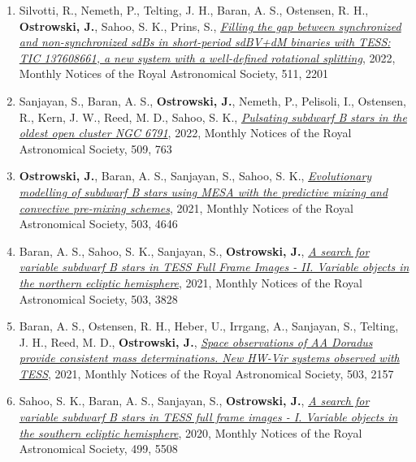 \documentclass[margin, 10pt]{res} %
\begin{document}
\begin{resume}
\begin{enumerate}
    \item Silvotti, R., Nemeth, P., Telting, J. H., Baran, A. S., Ostensen, R. H., \textbf{Ostrowski, J.}, Sahoo, S. K., Prins, S., \href{https://ui.adsabs.harvard.edu/abs/2022MNRAS.511.2201S/abstract}{\textit{Filling the gap between synchronized and non-synchronized sdBs in short-period sdBV+dM binaries with TESS: TIC 137608661, a new system with a well-defined rotational splitting}}, 2022, Monthly Notices of the Royal Astronomical Society, 511, 2201

    \item Sanjayan, S., Baran, A. S., \textbf{Ostrowski, J.}, Nemeth, P., Pelisoli, I., Ostensen, R., Kern, J. W., Reed, M. D., Sahoo, S. K., \href{https://ui.adsabs.harvard.edu/abs/2022MNRAS.509..763S/abstract}{\textit{Pulsating subdwarf B stars in the oldest open cluster NGC 6791}}, 2022, Monthly Notices of the Royal Astronomical Society, 509, 763

    \item \textbf{Ostrowski, J.}, Baran, A. S., Sanjayan, S., Sahoo, S. K., \href{https://ui.adsabs.harvard.edu/abs/2021MNRAS.503.4646O/abstract}{\textit{Evolutionary modelling of subdwarf B stars using MESA with the predictive mixing and convective pre-mixing schemes}}, 2021, Monthly Notices of the Royal Astronomical Society, 503, 4646

    \item Baran, A. S., Sahoo, S. K., Sanjayan, S., \textbf{Ostrowski, J.}, \href{https://ui.adsabs.harvard.edu/abs/2021MNRAS.503.3828B/abstract}{\textit{A search for variable subdwarf B stars in TESS Full Frame Images - II. Variable objects in the northern ecliptic hemisphere}}, 2021, Monthly Notices of the Royal Astronomical Society, 503, 3828

    \item Baran, A. S., Ostensen, R. H., Heber, U., Irrgang, A., Sanjayan, S., Telting, J. H., Reed, M. D., \textbf{Ostrowski, J.}, \href{https://ui.adsabs.harvard.edu/abs/2021MNRAS.503.2157B/abstract}{\textit{Space observations of AA Doradus provide consistent mass determinations. New HW-Vir systems observed with TESS}}, 2021, Monthly Notices of the Royal Astronomical Society, 503, 2157

    \item Sahoo, S. K., Baran, A. S., Sanjayan, S., \textbf{Ostrowski, J.}, \href{https://ui.adsabs.harvard.edu/abs/2020MNRAS.499.5508S/abstract}{\textit{A search for variable subdwarf B stars in TESS full frame images - I. Variable objects in the southern ecliptic hemisphere}}, 2020, Monthly Notices of the Royal Astronomical Society, 499, 5508


\end{enumerate}
\end{resume}
\end{document}
